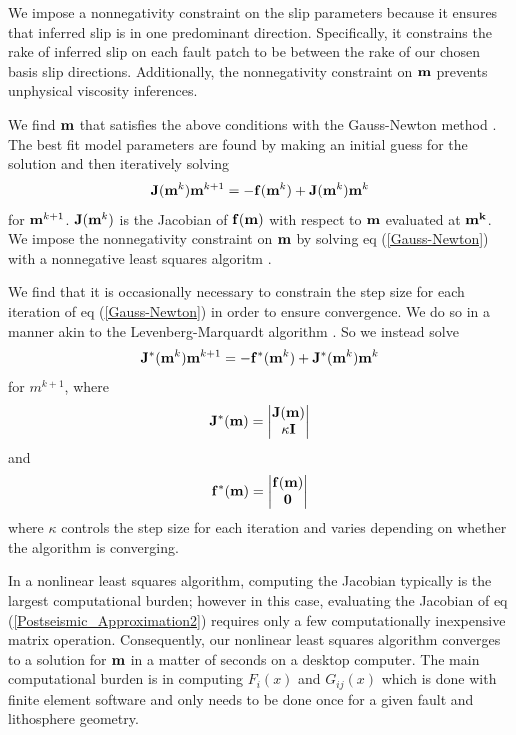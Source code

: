 \documentclass[12pt]{article}
\begin{document}
We impose a nonnegativity constraint on the slip parameters because it
ensures that inferred slip is in one predominant direction.
Specifically, it constrains the rake of inferred slip on each fault
patch to be between the rake of our chosen basis slip
directions. Additionally, the nonnegativity constraint on $\bold{m}$
prevents unphysical viscosity inferences.

We find $\bold{m}$ that satisfies the above conditions with the
Gauss-Newton method \citep{A2013}.  The best fit model parameters are
found by making an initial guess for the solution and then iteratively
solving
\begin{equation}\label{Gauss-Newton}
\bold{J}(\bold{m}^{k})\bold{m}^{k+1} = -\bold{f}(\bold{m}^k) + \bold{J}(\bold{m}^{k})\bold{m}^{k}
\end{equation}
for $\bold{m}^{k+1}$.  $\bold{J}(\bold{m}^k)$ is the Jacobian of
$\bold{f(m)}$ with respect to $\bold{m}$ evaluated at $\bold{m^k}$. We
impose the nonnegativity constraint on $\bold{m}$ by solving eq
(\ref{Gauss-Newton}) with a nonnegative least squares algoritm
\cite{LH1974}.

We find that it is occasionally necessary to constrain the step size
for each iteration of eq (\ref{Gauss-Newton}) in order to ensure
convergence.  We do so in a manner akin to the Levenberg-Marquardt
algorithm \citep{A2013}.  So we instead solve
\begin{equation}\label{Levenberg-Marquardt}
  \bold{J^*}(\bold{m}^k)\bold{m}^{k+1} = -\bold{f^*}(\bold{m}^k) + \bold{J^*}(\bold{m}^k)\bold{m}^k
\end{equation}
for $m^{k+1}$, where
\begin{equation}
  \bold{J^*}(\bold{m}) = 
      \begin{vmatrix}
      \bold{J}(\bold{m})\\
      \kappa\bold{I}
      \end{vmatrix}
\end{equation}
and
\begin{equation}
  \bold{f^*}(\bold{m}) = 
      \begin{vmatrix}
      \bold{f}(\bold{m})\\
      \bold{0}
      \end{vmatrix}
\end{equation}
where $\kappa$ controls the step size for each iteration and varies
depending on whether the algorithm is converging.  

In a nonlinear least squares algorithm, computing the Jacobian
typically is the largest computational burden; however in this case,
evaluating the Jacobian of eq (\ref{Postseismic_Approximation2})
requires only a few computationally inexpensive matrix operation.
Consequently, our nonlinear least squares algorithm converges to a
solution for $\bold{m}$ in a matter of seconds on a desktop computer.  The
main computational burden is in computing $F_i(x)$ and $G_{ij}(x)$
which is done with finite element software and only needs to be done
once for a given fault and lithosphere geometry.
\end{document}
